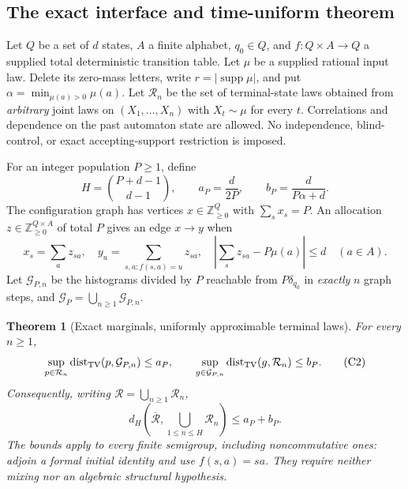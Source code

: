 \documentclass[11pt]{article}
\newtheorem{theorem}{Theorem}
\begin{document}
\subsection{The exact interface and time-uniform theorem}

Let $Q$ be a set of $d$ states, $A$ a finite alphabet, $q_0\in Q$, and $f:Q\times A\to Q$ a supplied total deterministic transition table. Let $\mu$ be a supplied rational input law. Delete its zero-mass letters, write $r=|\operatorname{supp}\mu|$, and put $\alpha=\min_{\mu(a)>0}\mu(a)$. Let $\mathcal R_n$ be the set of terminal-state laws obtained from \emph{arbitrary} joint laws on $(X_1,\ldots,X_n)$ with $X_t\sim\mu$ for every $t$. Correlations and dependence on the past automaton state are allowed. No independence, blind-control, or exact accepting-support restriction is imposed.

For an integer population $P\ge1$, define
\[
H=\binom{P+d-1}{d-1},\qquad a_P=\frac d{2P},\qquad
b_P=\frac d{P\alpha+d}.
\]
The configuration graph has vertices $x\in\mathbb Z_{\ge0}^Q$ with $\sum_sx_s=P$. An allocation $z\in\mathbb Z_{\ge0}^{Q\times A}$ of total $P$ gives an edge $x\to y$ when
\[
x_s=\sum_a z_{sa},\quad y_u=\sum_{s,a:f(s,a)=u}z_{sa},\quad
\left|\sum_s z_{sa}-P\mu(a)\right|\le d\quad(a\in A).
\tag{C1}
\]
Let $\mathcal G_{P,n}$ be the histograms divided by $P$ reachable from $P\delta_{q_0}$ in \emph{exactly} $n$ graph steps, and $\mathcal G_P=\bigcup_{n\ge1}\mathcal G_{P,n}$.

\begin{theorem}[Exact marginals, uniformly approximable terminal laws]\label{thm:population}
For every $n\ge1$,
\[
\sup_{p\in\mathcal R_n}\operatorname{dist}_{\rm TV}(p,\mathcal G_{P,n})\le a_P,
\qquad
\sup_{g\in\mathcal G_{P,n}}\operatorname{dist}_{\rm TV}(g,\mathcal R_n)\le b_P.
\tag{C2}
\]
Consequently, writing $\mathcal R=\bigcup_{n\ge1}\mathcal R_n$,
\[
d_H\left(\overline{\mathcal R},\bigcup_{1\le n\le H}\mathcal R_n\right)
\le a_P+b_P.
\tag{C3}
\]
The bounds apply to every finite semigroup, including noncommutative ones: adjoin a formal initial identity and use $f(s,a)=sa$. They require neither mixing nor an algebraic structural hypothesis.
\end{theorem}
\end{document}
